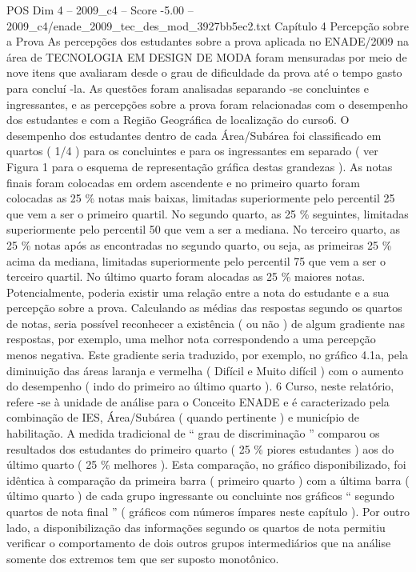 \begin{textsample}{POS Dim 4 – 2009\_c4 – Score -5.00 – 2009\_c4/enade\_2009\_tec\_des\_mod\_3927bb5ec2.txt}  \label{ex:f4_pos_333}
Capítulo 4 Percepção sobre a Prova As percepções dos estudantes sobre a prova aplicada no ENADE/2009 na área de TECNOLOGIA EM DESIGN DE MODA foram mensuradas por meio de nove itens que avaliaram desde o grau de dificuldade da prova até o tempo gasto para concluí -la.
As questões foram analisadas separando -se concluintes e ingressantes, e as percepções sobre a prova foram relacionadas com o desempenho dos estudantes e com a Região Geográfica de localização do curso6.
O desempenho dos estudantes dentro de cada Área/Subárea foi classificado em quartos ( 1/4 ) para os concluintes e para os ingressantes em separado ( ver Figura 1 para o esquema de representação gráfica destas grandezas ).
As notas finais foram colocadas em ordem ascendente e no primeiro quarto foram colocadas as 25 \% notas mais baixas, limitadas superiormente pelo percentil 25 que vem a ser o primeiro quartil.
No segundo quarto, as 25 \% seguintes, limitadas superiormente pelo percentil 50 que vem a ser a mediana.
No terceiro quarto, as 25 \% notas após as encontradas no segundo quarto, ou seja, as primeiras 25 \% acima da mediana, limitadas superiormente pelo percentil 75 que vem a ser o terceiro quartil.
No último quarto foram alocadas as 25 \% maiores notas.
Potencialmente, poderia existir uma relação entre a nota do estudante e a sua percepção sobre a prova.
Calculando as médias das respostas segundo os quartos de notas, seria possível reconhecer a existência ( ou não ) de algum gradiente nas respostas, por exemplo, uma melhor nota correspondendo a uma percepção menos negativa.
Este gradiente seria traduzido, por exemplo, no gráfico 4.1a, pela diminuição das áreas laranja e vermelha ( Difícil e Muito difícil ) com o aumento do desempenho ( indo do primeiro ao último quarto ). 6 Curso, neste relatório, refere -se à unidade de análise para o Conceito ENADE e é caracterizado pela combinação de IES, Área/Subárea ( quando pertinente ) e município de habilitação.
A medida tradicional de “ grau de discriminação ” comparou os resultados dos estudantes do primeiro quarto ( 25 \% piores estudantes ) aos do último quarto ( 25 \% melhores ).
Esta comparação, no gráfico disponibilizado, foi idêntica à comparação da primeira barra ( primeiro quarto ) com a última barra ( último quarto ) de cada grupo ingressante ou concluinte nos gráficos “ segundo quartos de nota final ” ( gráficos com números ímpares neste capítulo ).
Por outro lado, a disponibilização das informações segundo os quartos de nota permitiu verificar o comportamento de dois outros grupos intermediários que na análise somente dos extremos tem que ser suposto monotônico.

\end{textsample}
